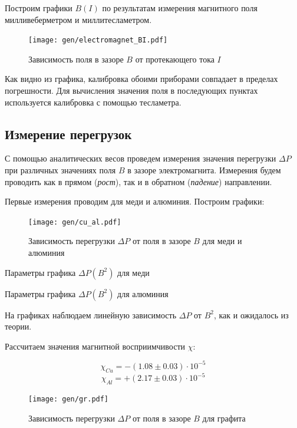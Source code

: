 \documentclass[12pt,a4paper]{article}
\begin{document}
	Построим графики $B(I)$ по результатам измерения магнитного поля милливеберметром и миллитесламетром.
	
	\begin{figure}[H]
		\texttt{[image: gen/electromagnet\_BI.pdf]}
		\caption{Зависимость поля в зазоре $B$ от протекающего тока $I$}
	\end{figure}
	
	Как видно из графика, калибровка обоими приборами совпадает в пределах погрешности. Для вычисления значения поля в последующих пунктах используется калибровка с помощью тесламетра.
	
	\subsection*{Измерение перегрузок}
	
	С помощью аналитических весов проведем измерения значения перегрузки $\Delta P$ при различных значениях поля $B$ в зазоре электромагнита. Измерения будем проводить как в прямом (\textit{рост}), так и в обратном (\textit{падение}) направлении.
	
	Первые измерения проводим для меди и алюминия. Построим графики:
	
	\begin{figure}[H]
		\texttt{[image: gen/cu\_al.pdf]}
		\caption{Зависимость перегрузки $\Delta P$ от поля в зазоре $B$ для меди и алюминия}
	\end{figure}

	\begin{table}[h]
		\caption{Параметры графика $\Delta P(B^2)$ для меди}
		
	\end{table}
	
	\begin{table}[h]
		\caption{Параметры графика $\Delta P(B^2)$ для алюминия}
		
	\end{table}
		
	На графиках наблюдаем линейную зависимость $\Delta P$ от $B^2$, как и ожидалось из теории.
	
	Рассчитаем значения магнитной восприимчивости $\chi$:
	
	$$\chi_{Cu} = -(1.08 \pm 0.03) \cdot 10^{-5} $$
	$$\chi_{Al} = +(2.17 \pm 0.03) \cdot 10^{-5} $$
	
	\begin{figure}[H]
		\texttt{[image: gen/gr.pdf]}
		\caption{Зависимость перегрузки $\Delta P$ от поля в зазоре $B$ для графита}
	\end{figure}
	
\end{document}
